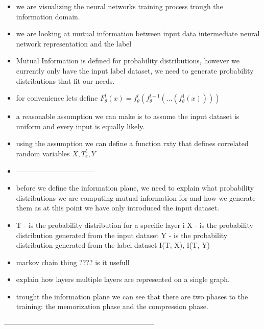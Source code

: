 \begin{itemize}
  \item{
      we are visualizing the neural networks training process trough the
      information domain.
    }
  \item{
      we are looking at mutual information between input data intermediate
      neural network representation and the label
    }
  \item{
      Mutual Information is defined for probability distributions, however we
      currently only have the input label dataset, we need to generate
      probability distributions that fit our needs.
    }
  \item{
      for convenience lets define $F_{\theta}^l(x) =
      f_{\theta}^l(f_{\theta}^{l-1}(...(f_{\theta}^1(x))))$
    }
  \item{
      a reasonable assumption we can make is to assume the input dataset is
      uniform and every input is equally likely.
    }
  \item{
      using the assumption we can define a function rxty that defines correlated
      random variables $ X, T_e^l, Y $
    }
  \item{
      ---------------------------------
    }
  \item{
      before we define the information plane, we need to explain what
      probability distributions we are computing mutual information for and how
      we generate them as at this point we have only introduced the input
      dataset.
    }
  \item{
      T - is the probability distribution for a specific layer i 
      X - is the probability distribution generated from the input dataset 
      Y - is the probability distribution generated from the label dataset
      I(T, X), I(T, Y)
    }
  \item{
      markov chain thing ???? is it usefull
    }
  \item{
      explain how layers multiple layers are represented on a single graph.
    }
  \item{
      trought the information plane we can see that there are two phases to the
      training: the memorization phase and the compression phase.
    }
\end{itemize}

---------------------------------------------------------------


